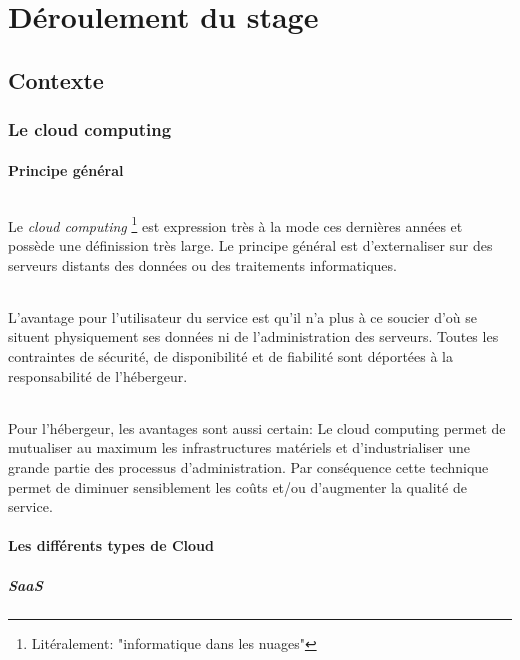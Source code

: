 \part{Déroulement du stage}
\chapter{Contexte}
\section{Le cloud computing}
\subsection{Principe général}
\paragraph*{}
Le \emph{cloud computing} \footnote{Litéralement: "informatique dans les nuages"} est expression
très à la mode ces dernières années et possède une définission très large.
Le principe général est d'externaliser sur des serveurs distants des données ou
des traitements informatiques.

\paragraph*{}
L'avantage pour l'utilisateur du service est qu'il n'a plus à ce soucier d'où se situent physiquement
ses données ni de l'administration des serveurs. Toutes les contraintes de sécurité, de disponibilité
et de fiabilité sont déportées à la responsabilité de l'hébergeur.

\paragraph*{}
Pour l'hébergeur, les avantages sont aussi certain: Le cloud computing permet de mutualiser au maximum
les infrastructures matériels et d'industrialiser une grande partie des processus d'administration.
Par conséquence cette technique permet de diminuer sensiblement les coûts et/ou d'augmenter la qualité
de service.

\subsection{Les différents types de Cloud}

\subsubsection{SaaS}
